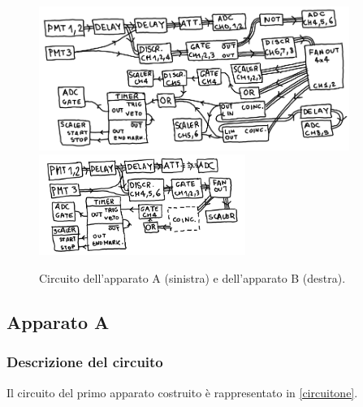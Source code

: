 \begin{figure}
	\hspace{-0.25\textwidth}
	\includegraphics[width=0.9\textwidth]{immagini/circuitone}~
	\includegraphics[width=0.6\textwidth]{immagini/circuitob}
	\caption{Circuito dell'apparato A (sinistra) e dell'apparato B (destra).}
	\label{circuitone}
\end{figure}

\subsection{Apparato A}



\subsubsection{Descrizione del circuito}

Il circuito del primo apparato costruito è rappresentato in \autoref{circuitone}.

